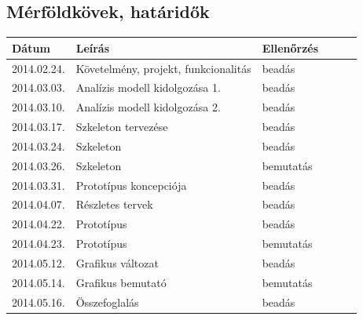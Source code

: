 \subsection{Mérföldkövek, határidők}
\begin{longtable}{| l | p{7cm} | l | l | l | l |}
\hline
\textbf{Dátum} & \textbf{Leírás} & \textbf{Ellenőrzés} \tabularnewline
\hline\hline
2014.02.24. & Követelmény, projekt, funkcionalitás & beadás \tabularnewline
\hline
2014.03.03. & Analízis modell kidolgozása 1. & beadás \tabularnewline
\hline
2014.03.10. & Analízis modell kidolgozása 2. & beadás \tabularnewline
\hline
2014.03.17. & Szkeleton tervezése & beadás \tabularnewline
\hline
2014.03.24. & Szkeleton & beadás \tabularnewline
\hline
2014.03.26. & Szkeleton & bemutatás \tabularnewline
\hline
2014.03.31. & Prototípus koncepciója & beadás \tabularnewline
\hline
2014.04.07. & Részletes tervek & beadás \tabularnewline
\hline
2014.04.22. & Prototípus & beadás \tabularnewline
\hline
2014.04.23. & Prototípus & bemutatás \tabularnewline
\hline
2014.05.12. & Grafikus változat & beadás \tabularnewline
\hline
2014.05.14. & Grafikus bemutató & bemutatás \tabularnewline
\hline
2014.05.16. & Összefoglalás & beadás \tabularnewline
\hline
\end{longtable}


